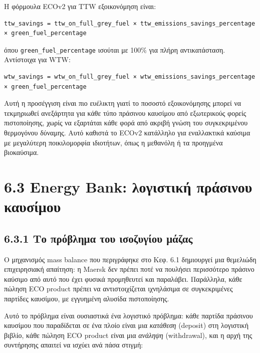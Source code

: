 Η φόρμουλα ECOv2 για TTW εξοικονόμηση είναι:

\begin{verbatim}
ttw_savings = ttw_on_full_grey_fuel × ttw_emissions_savings_percentage × green_fuel_percentage
\end{verbatim}

όπου \texttt{green\_fuel\_percentage} ισούται με 100\% για πλήρη
αντικατάσταση. Αντίστοιχα για WTW:

\begin{verbatim}
wtw_savings = wtw_on_full_grey_fuel × wtw_emissions_savings_percentage × green_fuel_percentage
\end{verbatim}

Αυτή η προσέγγιση είναι πιο ευέλικτη γιατί το ποσοστό εξοικονόμησης
μπορεί να τεκμηριωθεί ανεξάρτητα για κάθε τύπο πράσινου καυσίμου από
εξωτερικούς φορείς πιστοποίησης, χωρίς να εξαρτάται κάθε φορά από ακριβή
γνώση του συγκεκριμένου θερμογόνου δύναμης. Αυτό καθιστά το ECOv2
κατάλληλο για εναλλακτικά καύσιμα με μεγαλύτερη ποικιλομορφία ιδιοτήτων,
όπως η μεθανόλη ή τα προηγμένα βιοκαύσιμα.

\section{6.3 Energy Bank: λογιστική πράσινου
καυσίμου}\label{energy-bank-ux3bbux3bfux3b3ux3b9ux3c3ux3c4ux3b9ux3baux3ae-ux3c0ux3c1ux3acux3c3ux3b9ux3bdux3bfux3c5-ux3baux3b1ux3c5ux3c3ux3afux3bcux3bfux3c5}

\subsection{6.3.1 Το πρόβλημα του ισοζυγίου
μάζας}\label{ux3c4ux3bf-ux3c0ux3c1ux3ccux3b2ux3bbux3b7ux3bcux3b1-ux3c4ux3bfux3c5-ux3b9ux3c3ux3bfux3b6ux3c5ux3b3ux3afux3bfux3c5-ux3bcux3acux3b6ux3b1ux3c2}

Ο μηχανισμός mass balance που περιγράφηκε στο Κεφ. 6.1 δημιουργεί μια
θεμελιώδη επιχειρησιακή απαίτηση: η Maersk δεν πρέπει ποτέ να πουλήσει
περισσότερο πράσινο καύσιμο από αυτό που έχει φυσικά προμηθευτεί και
παραλάβει. Παράλληλα, κάθε πώληση ECO product πρέπει να αντιστοιχίζεται
ιχνηλάσιμα σε συγκεκριμένες παρτίδες καυσίμου, με εγγυημένη αλυσίδα
πιστοποίησης.

Αυτό το πρόβλημα είναι ουσιαστικά ένα λογιστικό πρόβλημα: κάθε παρτίδα
πράσινου καυσίμου που παραδίδεται σε ένα πλοίο είναι μια \emph{κατάθεση}
(deposit) στη λογιστική βιβλίο, κάθε πώληση ECO product είναι μια
\emph{ανάληψη} (withdrawal), και η αρχή της συντήρησης απαιτεί να ισχύει
ανά πάσα στιγμή:

